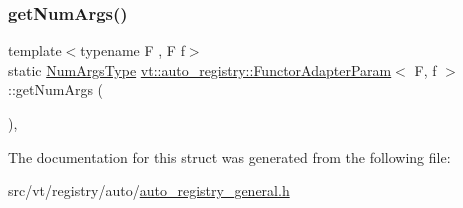 \mbox{\label{structvt_1_1auto__registry_1_1_functor_adapter_param_a46cb42cdc04f9592813a5bde120157fa}} 
\subsubsection{\texorpdfstring{get\+Num\+Args()}{getNumArgs()}}
{\footnotesize\ttfamily template$<$typename F , F f$>$ \\
static \hyperlink{namespacevt_1_1auto__registry_aebda1d9d765bc9147dc654ad0712c936}{Num\+Args\+Type} \hyperlink{structvt_1_1auto__registry_1_1_functor_adapter_param}{vt\+::auto\+\_\+registry\+::\+Functor\+Adapter\+Param}$<$ F, f $>$\+::get\+Num\+Args (\begin{DoxyParamCaption}{ }\end{DoxyParamCaption})\hspace{0.3cm}{\ttfamily [inline]}, {\ttfamily [static]}}



The documentation for this struct was generated from the following file\+:\begin{DoxyCompactItemize}
\item 
src/vt/registry/auto/\hyperlink{auto__registry__general_8h}{auto\+\_\+registry\+\_\+general.\+h}\end{DoxyCompactItemize}
